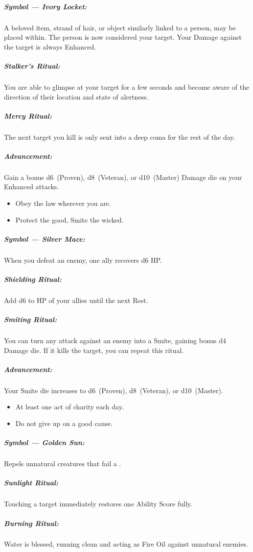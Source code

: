\documentclass[itdr/core]{subfiles}
\begin{document}
\subparagraph{Symbol --- Ivory Locket:} A beloved item, strand of hair, or object similarly linked to a person, may be placed within. The person is now considered your target. Your Damage against the target is always Enhanced.

\subparagraph{Stalker's Ritual:} You are able to glimpse at your target for a few seconds and become aware of the direction of their location and state of alertness.

\subparagraph{Mercy Ritual:} The next target you kill is only sent into a deep coma for the rest of the day.

\subparagraph{Advancement:} Gain a bonus d6~(Proven), d8~(Veteran), or d10~(Master) Damage die on your Enhanced attacks.

\creedskip

{\em\begin{itemize}
		\item Obey the law wherever you are.
		\item Protect the good, Smite the wicked.
\end{itemize}}

\subparagraph{Symbol --- Silver Mace:} When you defeat an enemy, one ally recovers d6 HP.

\subparagraph{Shielding Ritual:} Add d6 to HP of your allies until the next Rest.

\subparagraph{Smiting Ritual:} You can turn any attack against an enemy into a Smite, gaining bonus d4 Damage die. If it kills the target, you can repeat this ritual.

\subparagraph{Advancement:} Your Smite die increases to d6~(Proven), d8~(Veteran), or d10~(Master).

\creedskip

{\em\begin{itemize}
		\item At least one act of charity each day.
		\item Do not give up on a good cause.
\end{itemize}}

\subparagraph{Symbol --- Golden Sun:} Repels unnatural creatures that fail a .

\subparagraph{Sunlight Ritual:} Touching a target immediately restores one Ability Score fully.

\subparagraph{Burning Ritual:} Water is blessed, running clean and acting as Fire Oil against unnatural enemies.
\end{document}
